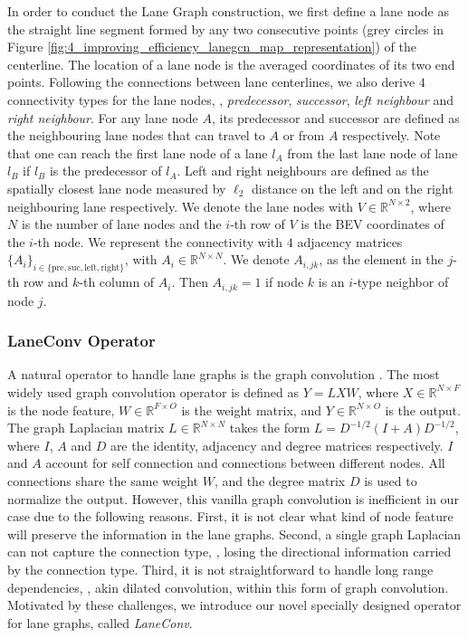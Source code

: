 In order to conduct the Lane Graph construction, we first define a lane node as the straight line segment formed by any two consecutive points (grey circles in Figure \ref{fig:4_improving_efficiency_lanegcn_map_representation}) of the centerline. The location of a lane node is the averaged coordinates of its two end points. Following the  connections between lane centerlines, we also derive $4$ connectivity types for the lane nodes, \ie, \textit{predecessor}, \textit{successor}, \textit{left neighbour} and \textit{right neighbour}. For any lane node $A$, its predecessor and successor are defined as the neighbouring lane nodes that can travel to $A$ or from $A$ respectively. Note that one can reach the first lane node of a lane $l_{A}$ from the last lane node of lane $l_{B}$ if $l_{B}$ is the predecessor of $l_{A}$. Left and right neighbours are defined as the spatially closest lane node measured by $\ell_2$ distance on the left and on the right neighbouring lane respectively. We denote the lane nodes with $V \in \mathbb{R}^{N \times 2}$, where $N$ is the number of lane nodes and the $i$-th row of $V$ is the BEV coordinates of the $i$-th node. We represent the connectivity with $4$ adjacency matrices $\{A_i\}_{ i \in \{\text{pre}, \text{suc}, \text{left}, \text{right}\} }$, with $A_i \in \mathbb{R}^{N \times N}$. We denote $A_{i, jk}$, as the element in the $j$-th row and $k$-th column of $A_i$. Then  $A_{i, jk} = 1$ if node $k$ is an $i$-type neighbor of node $j$. 

\subsubsection{LaneConv Operator}
\label{subsubsec:4_improving_efficiency_lane_conv}

A natural operator to handle lane graphs is the graph convolution \cite{shuman2013emerging}.
The most widely used graph convolution operator \cite{kipf2016semi} is defined as $Y = LXW$, where $X \in \mathbb{R}^{N \times F}$ is the node feature, $W \in \mathbb{R}^{F \times O}$ is the weight matrix, and $Y \in \mathbb{R}^{N \times O}$ is the output. The graph Laplacian matrix $L \in \mathbb{R}^{N \times N}$ takes the form $L = D^{-1/2}(I + A)D^{-1/2}$, where $I$, $A$ and $D$ are the identity, adjacency and degree matrices respectively. $I$ and $A$ account for self connection and connections between different nodes. All connections share the same weight $W$, and the degree matrix $D$ is used to normalize the output. However, this vanilla graph convolution is inefficient in our case due to the following reasons. First, it is not clear what kind of node feature will preserve the information in the lane graphs. Second, a single graph Laplacian can not capture the connection type, \ie, losing the directional information carried by the connection type. Third, it is not straightforward to handle long range dependencies, \eg, akin dilated convolution, within this form of graph convolution. Motivated by these challenges, we introduce our novel specially designed operator for lane graphs, called \textit{LaneConv}.

